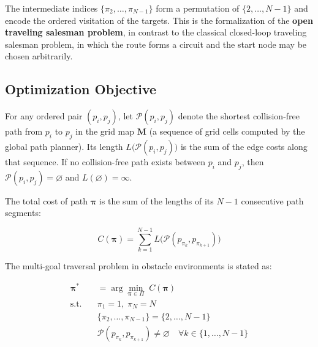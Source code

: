 The intermediate indices $\{\pi_2, \dots, \pi_{N-1}\}$ form a permutation of $\{2, \dots, N-1\}$ and encode the ordered visitation of the targets. This is the formalization of the \textbf{open traveling salesman problem}, in contrast to the classical closed-loop traveling salesman problem, in which the route forms a circuit and the start node may be chosen arbitrarily\textcolor{blue}{\cite{ref4,ref36}}.

\subsection{Optimization Objective}

For any ordered pair $(p_i, p_j)$, let $\mathcal{P}(p_i, p_j)$ denote the shortest collision-free path from $p_i$ to $p_j$ in the grid map $\mathbf{M}$ (a sequence of grid cells computed by the global path planner). Its length $L\big(\mathcal{P}(p_i, p_j)\big)$ is the sum of the edge costs along that sequence. If no collision-free path exists between $p_i$ and $p_j$, then $\mathcal{P}(p_i, p_j) = \varnothing$ and $L(\varnothing) = \infty$.

The total cost of path $\bm{\pi}$ is the sum of the lengths of its $N-1$ consecutive path segments:

\begin{equation}
C(\bm{\pi}) = \sum_{k=1}^{N-1} L\big(\mathcal{P}(p_{\pi_k}, p_{\pi_{k+1}})\big)
\label{eq:totalcost}
\end{equation}

The multi-goal traversal problem in obstacle environments is stated as:

\begin{align}
\bm{\pi}^{*} &= \arg\min_{\bm{\pi} \in \Pi} \; C(\bm{\pi})
\label{eq:opt}\\
\text{s.t.} \quad &\pi_1 = 1,\; \pi_N = N \nonumber\\
&\{\pi_2, \dots, \pi_{N-1}\} = \{2, \dots, N-1\} \nonumber\\
&\mathcal{P}(p_{\pi_k}, p_{\pi_{k+1}}) \neq \varnothing \quad \forall k \in \{1, \dots, N-1\} \nonumber
\end{align}


